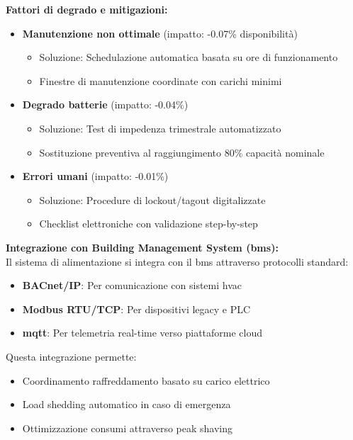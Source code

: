 \textbf{Fattori di degrado e mitigazioni:}
\begin{itemize}
    \item \textbf{Manutenzione non ottimale} (impatto: -0.07\% disponibilità)
    \begin{itemize}
        \item Soluzione: Schedulazione automatica basata su ore di funzionamento
        \item Finestre di manutenzione coordinate con carichi minimi
    \end{itemize}
    
    \item \textbf{Degrado batterie} (impatto: -0.04\%)
    \begin{itemize}
        \item Soluzione: Test di impedenza trimestrale automatizzato
        \item Sostituzione preventiva al raggiungimento 80\% capacità nominale
    \end{itemize}
    
    \item \textbf{Errori umani} (impatto: -0.01\%)
    \begin{itemize}
        \item Soluzione: Procedure di lockout/tagout digitalizzate
        \item Checklist elettroniche con validazione step-by-step
    \end{itemize}
\end{itemize}

\textbf{Integrazione con Building Management System (\gls{bms}):}\\
Il sistema di alimentazione si integra con il \gls{bms} attraverso protocolli standard:
\begin{itemize}
    \item \textbf{BACnet/IP}: Per comunicazione con sistemi \gls{hvac}
    \item \textbf{Modbus RTU/TCP}: Per dispositivi legacy e PLC
    \item \textbf{\gls{mqtt}}: Per telemetria real-time verso piattaforme cloud
\end{itemize}

Questa integrazione permette:
\begin{itemize}
    \item Coordinamento raffreddamento basato su carico elettrico
    \item Load shedding automatico in caso di emergenza
    \item Ottimizzazione consumi attraverso peak shaving
\end{itemize}

